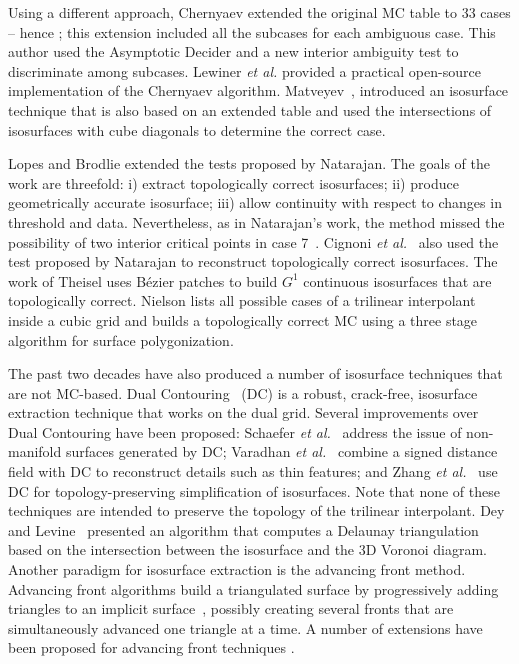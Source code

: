 Using a different approach, Chernyaev \cite{Chernyaev95marchingcubes} extended the original MC table to 33 cases -- hence \mc{}; this extension included all the subcases for each ambiguous case. This author used the Asymptotic Decider and a new interior ambiguity test to discriminate among subcases. Lewiner \emph{et al.} \cite{Lewiner:2003} provided a practical open-source implementation of the Chernyaev algorithm.
%
Matveyev~\cite{Matveyev99}, introduced an isosurface technique that is also based on an extended table and used the intersections of isosurfaces with cube diagonals to determine the correct case. 

Lopes and Brodlie \cite{lopes:tvcg:2003} extended the tests proposed by Natarajan. The goals of the work are threefold: i) extract topologically correct isosurfaces; ii) produce geometrically accurate isosurface; iii) allow continuity with respect to changes in threshold and data.  Nevertheless, as in Natarajan's work, the method missed the possibility of two interior critical points in case 7~\cite{lopes:tvcg:2003}.
%
%
Cignoni \emph{et al.}~\cite{Cignoni2000399} also used the test proposed by Natarajan to reconstruct topologically correct isosurfaces.
%
The work of Theisel \cite{CGF:CGF00563} uses B\'ezier patches to build $G^1$ continuous isosurfaces that are topologically correct.  Nielson \cite{Nielson03onmarching} lists all possible cases of a trilinear interpolant inside a cubic grid and builds a topologically correct MC using a three stage algorithm for surface polygonization. 

The past two decades have also produced a number of isosurface techniques that are not MC-based. Dual Contouring~\cite{Ju:2002:DCH:566654.566586} (DC) is a robust, crack-free, isosurface extraction technique that works on the dual grid. Several improvements over Dual Contouring have been proposed: Schaefer \emph{et al.}~\cite{Schaefer:2007:MDC:1263130.1263312} address the issue of non-manifold surfaces generated by DC; Varadhan \emph{et al.}~\cite{Varadhan:2003:FSI:1081432.1081458} combine a signed distance field with DC to reconstruct details such as thin features; and Zhang \emph{et al.}~\cite{Zhang:2004:DCT:1032664.1034486} use DC for topology-preserving simplification of isosurfaces. Note that none of these techniques are intended to preserve the topology of the trilinear interpolant. Dey and Levine~\cite{Dey07} presented an algorithm that computes a Delaunay triangulation based on the intersection between the isosurface and the 3D Voronoi diagram. Another paradigm for isosurface extraction is the advancing front method. Advancing front algorithms build a triangulated surface by progressively adding triangles to an implicit surface~\cite{Hartmann98}, possibly creating several fronts that are simultaneously advanced one triangle at a time.  A number of extensions have been proposed for advancing front techniques \cite{Schreiner06, CGF:CGF972, Silva:1998:GCA:288692.288717}. 


